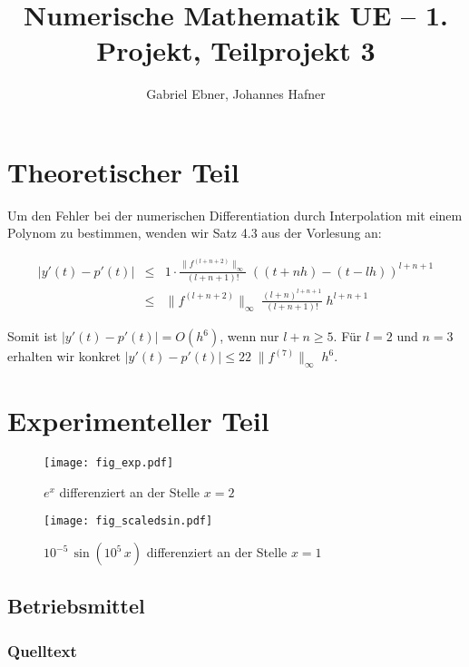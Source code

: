 \documentclass{scrartcl}
\begin{document}
\title{Numerische Mathematik UE -- 1. Projekt, Teilprojekt 3}
\author{Gabriel Ebner, Johannes Hafner}
\maketitle

\section{Theoretischer Teil}

Um den Fehler bei der numerischen Differentiation durch Interpolation mit einem
Polynom zu bestimmen, wenden wir Satz 4.3 aus der Vorlesung an:

\begin{eqnarray*}
|y'(t) - p'(t)| &\leq& 1 \cdot
    \frac{\|f^{(l+n+2)}\|_\infty}{(l+n+1)!}\; ((t+nh) - (t-lh))^{l+n+1} \\
  &\leq& \|f^{(l+n+2)}\|_\infty\; \frac{(l+n)^{l+n+1}}{(l+n+1)!}\; h^{l+n+1}
\end{eqnarray*}

Somit ist \(|y'(t)-p'(t)| = O(h^6)\), wenn nur \(l+n \geq 5\).  Für \(l=2\) und
\(n=3\) erhalten wir konkret \(|y'(t)-p'(t)| \leq 22\; \|f^{(7)}\|_\infty\; h^6\).

\section{Experimenteller Teil}

\begin{figure}[!htb]
\centering
\texttt{[image: fig\_exp.pdf]}
\caption{\(e^x\) differenziert an der Stelle \(x=2\)}
\label{fig:exp}
\end{figure}

\begin{figure}[!htb]
\centering
\texttt{[image: fig\_scaledsin.pdf]}
\caption{\(10^{-5}\, \sin(10^5\, x)\) differenziert an der Stelle \(x=1\)}
\label{fig:scaledsin}
\end{figure}

\subsection{Betriebsmittel}

\subsubsection{Quelltext}


\end{document}
